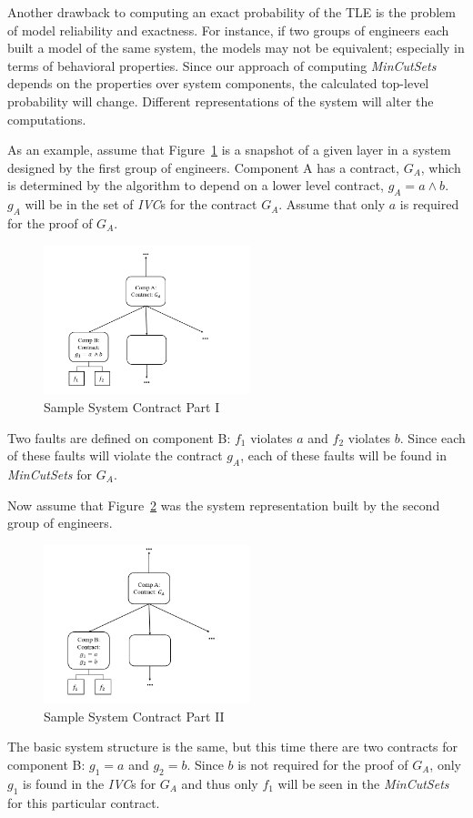 Another drawback to computing an exact probability of the TLE is the problem of model reliability and exactness. For instance, if two groups of engineers each built a model of the same system, the models may not be equivalent; especially in terms of behavioral properties. Since our approach of computing \textit{MinCutSets} depends on the properties over system components, the calculated top-level probability will change. Different representations of the system will alter the computations.  

As an example, assume that Figure~\ref{fig:probComp1} is a snapshot of a given layer in a system designed by the first group of engineers. Component A has a contract, $G_A$, which is determined by the \aivcalg algorithm to depend on a lower level contract, $g_A = a \land b$. $g_A$ will be in the set of \textit{IVC}s for the contract $G_A$. Assume that only $a$ is required for the proof of $G_A$. 

\begin{figure}[h]
\begin{center}
\includegraphics[width=6cm]{images/probComp1.PNG}
\caption{Sample System Contract Part I} \label{fig:probComp1}
\end{center}
\end{figure}

Two faults are defined on component B: $f_1$ violates $a$ and $f_2$ violates $b$. Since each of these faults will violate the contract $g_A$, each of these faults will be found in \textit{MinCutSets} for $G_A$.

Now assume that Figure~\ref{fig:probComp2} was the system representation built by the second group of engineers. 
\begin{figure}[h]
\begin{center}
\includegraphics[width=6cm]{images/probComp2.PNG}
\caption{Sample System Contract Part II} \label{fig:probComp2}
\end{center}
\end{figure} 
The basic system structure is the same, but this time there are two contracts for component B: $g_1 = a$ and $g_2 = b$. Since $b$ is not required for the proof of $G_A$, only $g_1$ is found in the \textit{IVC}s for $G_A$ and thus only $f_1$ will be seen in the \textit{MinCutSets} for this particular contract. 

